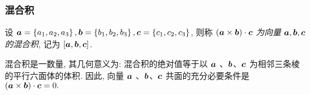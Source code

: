 % 
% 

\subsubsection{混合积}

\begin{definition}[向量的混合积]
    设 $ \vb*{a}=\left\{a_{1}, a_{2}, a_{3}\right\}, \vb*{b}=\left\{b_{1}, b_{2}, b_{3}\right\}, \vb*{c}=\left\{c_{1}, c_{2}, c_{3}\right\}$,
    则称 $ (\vb*{a} \times \vb*{b}) \cdot \vb*{c} $ \textit{为向量} $ \vb*{a}, \vb*{b}, \vb*{c} $ \textit{的混合积}, 记为 $ [\vb*{a}, \vb*{b}, \vb*{c}] $.
\end{definition}

\begin{theorem}[共面条件]
    混合积是一数量, 其几何意义为: 混合积的绝对值等于以 $ \vb*{a}$ 、$ \vb*{b} $、$ \vb*{c} $ 为相邻三条棱的平行六面体的体积.
    因此, 向量 $ \vb*{a}$ 、$ \vb*{b} $、$ \vb*{c} $ 共面的充分必要条件是 $ (\vb*{a} \times \vb*{b}) \cdot \vb*{c}=0 .$
\end{theorem}